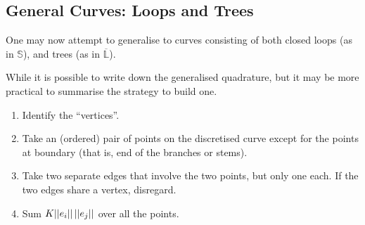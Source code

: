 \documentclass[../dissertation.tex]{subfiles}
\begin{document}
\subsection{General Curves: Loops and Trees}
One may now attempt to generalise to curves consisting of both closed loops (as in $\mathbb{S}$),
and trees (as in $\overline{\mathbb{L}}$).

While it is possible to write down the generalised quadrature,
but it may be more practical to summarise the strategy to build one.
\begin{enumerate}
    \item Identify the ``vertices''.
    \item Take an (ordered) pair of points on the discretised curve except for the points at boundary (that is, end of the branches or stems).
    \item Take two separate edges that involve the two points, but only one each.
        If the two edges share a vertex, disregard.
    \item Sum $K \lvert \lvert e_i \rvert \rvert \, \lvert \lvert e_j \rvert \rvert$ over all the points.
\end{enumerate}
\end{document}
